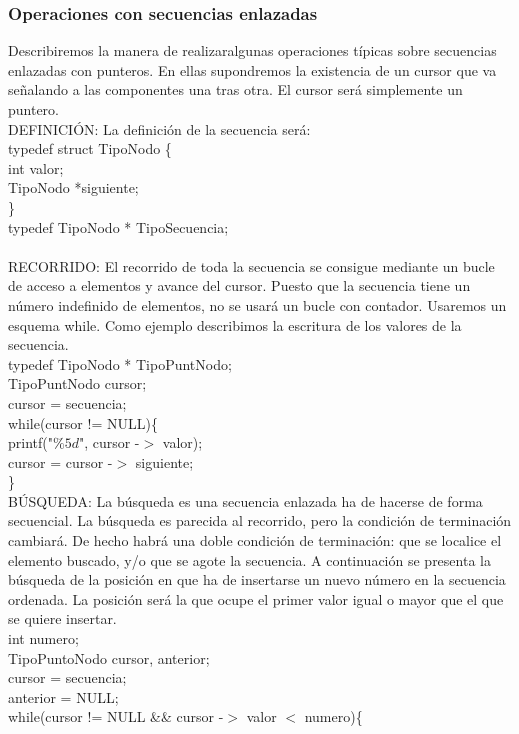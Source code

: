 \documentclass[11pt,a4paper]{article}
\begin{document}
  \subsubsection{Operaciones con secuencias enlazadas}
  Describiremos la manera de realizaralgunas operaciones típicas sobre secuencias enlazadas con punteros. En ellas supondremos la existencia de un cursor que va señalando a las componentes una tras otra. El cursor será simplemente un puntero.\\
  DEFINICIÓN: La definición de la secuencia será:\\
  typedef struct TipoNodo \{ \\
  int valor;\\
  TipoNodo *siguiente;\\
  \}\\
  typedef TipoNodo * TipoSecuencia;\\
  \\
  RECORRIDO: El recorrido de toda la secuencia se consigue mediante un bucle de acceso a elementos y avance del cursor. Puesto que la secuencia tiene un número indefinido de elementos, no se usará un bucle con contador. Usaremos un esquema while. Como ejemplo describimos la escritura de los valores de la secuencia.\\
  typedef TipoNodo * TipoPuntNodo;\\
  TipoPuntNodo cursor;\\
  cursor = secuencia;\\
  while(cursor != NULL)\{ \\
  printf("$\%5d$", cursor -$>$ valor);\\
  cursor = cursor -$>$ siguiente;\\
  \}\\
  BÚSQUEDA: La búsqueda es una secuencia enlazada ha de hacerse de forma secuencial. La búsqueda es parecida al recorrido, pero la condición de
  terminación cambiará. De hecho habrá una doble condición de terminación:
  que se localice el elemento buscado, y/o que se agote la secuencia. A continuación
  se presenta la búsqueda de la posición en que ha de insertarse un nuevo
  número en la secuencia ordenada. La posición será la que ocupe el primer
  valor igual o mayor que el que se quiere insertar.\\
  int numero;\\
  TipoPuntoNodo cursor, anterior;\\
  cursor = secuencia; \\
  anterior = NULL;\\
  while(cursor != NULL \&\& cursor -$>$ valor $<$ numero)\{\\
\end{document}
